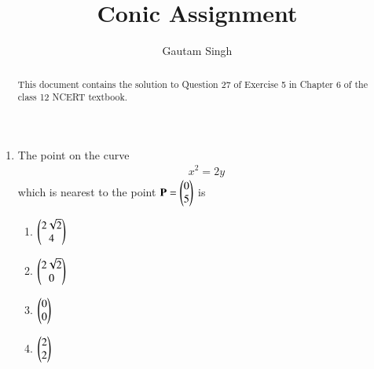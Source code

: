 \documentclass[journal,12pt,twocolumn]{IEEEtran}
\renewcommand{\vec}[1]{\boldsymbol{\mathbf{#1}}}
\begin{document}
\vspace{3cm}
\title{Conic Assignment}
\author{Gautam Singh}
\maketitle
\bigskip

\begin{abstract}
    This document contains the solution to Question 27 of Exercise 5 in Chapter
    6 of the class 12 NCERT textbook.
\end{abstract}

\begin{enumerate}
    \item The point on the curve 
    \begin{align}
        x^2 = 2y
        \label{eq:curve}
    \end{align}
    which is nearest to the point 
    $\vec{P} = \myvec{0\\5}$ is
    \begin{enumerate}
        \item $\begin{pmatrix}2\sqrt{2}\\4\end{pmatrix}$
        \item $\begin{pmatrix}2\sqrt{2}\\0\end{pmatrix}$
        \item $\begin{pmatrix}0\\0\end{pmatrix}$
        \item $\begin{pmatrix}2\\2\end{pmatrix}$
    \end{enumerate}


\end{enumerate}
\end{document}

